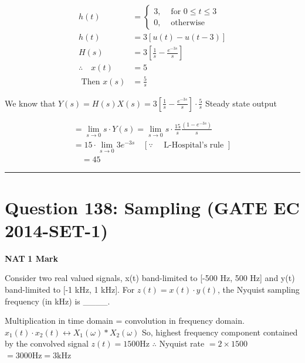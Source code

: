 \documentclass[11pt,a4paper]{article}
\begin{document}
\begin{tcolorbox}[solbox, title=Detailed Solution -- Question 137]
\[
\begin{aligned} h(t) &=\left\{\begin{array}{ll}3, & \text { for } 0 \leq t \leq 3 \\0, & \text { otherwise } \end{array}\right.\\ h(t) &=3[u(t)-u(t-3)] \\ H(s) &=3\left[\frac{1}{s}-\frac{e^{-3 s}}{s}\right] \\ \therefore \quad x(t) &=5 \\ \text { Then } x(s) &=\frac{5}{s} \end{aligned}
\]

 We know that 
$Y(s)=H(s) X(s)=3\left[\frac{1}{s}-\frac{e^{-3 s}}{s}\right] \cdot \frac{5}{s}$
 Steady state output

\[
\begin{array}{l} =\lim _{s \rightarrow 0} s \cdot Y(s)=\lim _{s \rightarrow 0} s \cdot \frac{15}{s} \frac{\left(1-e^{-3 s}\right)}{s} \\ =15 \cdot \lim _{s \rightarrow 0} 3 e^{-3 s} \quad[\because \quad \text { L-Hospital's rule }] \\ \quad=45 \end{array}
\]
\end{tcolorbox}

\vspace{1.5em}
\hrule
\vspace{1.5em}

\section*{Question 138: Sampling (GATE EC 2014-SET-1)}
\noindent \textbf{\color{primary}NAT} \hfill \textbf{\color{secondary}1 Mark}


\noindent Consider two real valued signals, x(t) band-limited to [-500 Hz, 500 Hz] and
y(t) band-limited to [-1 kHz, 1 kHz]. For $z(t) = x(t)\cdot  y(t)$, the Nyquist sampling
frequency (in kHz) is \_\_\_\_.


\begin{tcolorbox}[solbox, title=Detailed Solution -- Question 138]
Multiplication in time domain = convolution in frequency domain. 
$x_{1}(t) \cdot x_{2}(t) \leftrightarrow X_{1}(\omega) * X_{2}(\omega)$
 So, highest frequency component contained by the convolved signal $z(t)=1500 \mathrm{Hz}$
$\therefore$ Nyquist rate $=2 \times 1500$
$=3000 \mathrm{Hz}=3 \mathrm{kHz}$
\end{tcolorbox}
\end{document}
